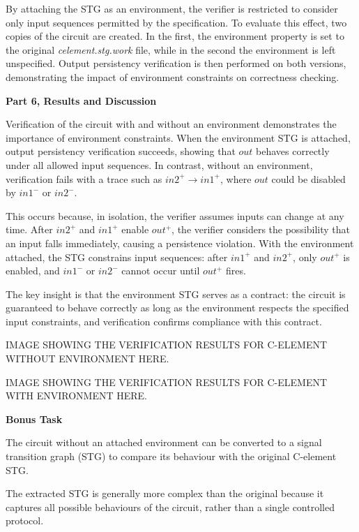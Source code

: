 \documentclass[a4paper,12pt]{article}
\begin{document}
By attaching the STG as an environment, the verifier is restricted to consider only input sequences permitted by the specification. To evaluate this effect, two copies of the circuit are created. In the first, the environment property is set to the original \textit{celement.stg.work} file, while in the second the environment is left unspecified. Output persistency verification is then performed on both versions, demonstrating the impact of environment constraints on correctness checking.

\textbf{Part 6, Results and Discussion}

Verification of the circuit with and without an environment demonstrates the importance of environment constraints. When the environment STG is attached, output persistency verification succeeds, showing that $out$ behaves correctly under all allowed input sequences. In contrast, without an environment, verification fails with a trace such as $in2^+ \rightarrow in1^+$, where $out$ could be disabled by $in1^-$ or $in2^-$. 

This occurs because, in isolation, the verifier assumes inputs can change at any time. After $in2^+$ and $in1^+$ enable $out^+$, the verifier considers the possibility that an input falls immediately, causing a persistence violation. With the environment attached, the STG constrains input sequences: after $in1^+$ and $in2^+$, only $out^+$ is enabled, and $in1^-$ or $in2^-$ cannot occur until $out^+$ fires. 

The key insight is that the environment STG serves as a contract: the circuit is guaranteed to behave correctly as long as the environment respects the specified input constraints, and verification confirms compliance with this contract.

\begin{large}
    IMAGE SHOWING THE VERIFICATION RESULTS FOR C-ELEMENT WITHOUT ENVIRONMENT HERE.
\end{large}

\begin{large}
    IMAGE SHOWING THE VERIFICATION RESULTS FOR C-ELEMENT WITH ENVIRONMENT HERE.
\end{large}

\textbf{Bonus Task}

The circuit without an attached environment can be converted to a signal transition graph (STG) to compare its behaviour with the original C-element STG. 

The extracted STG is generally more complex than the original because it captures all possible behaviours of the circuit, rather than a single controlled protocol. 
\end{document}
